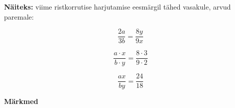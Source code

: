 \begin{center}
{{{\begin{flushleft}
\vspace{5mm}
\hspace{5mm} \textbf{Näiteks:} viime ristkorrutise harjutamise eesmärgil tähed vasakule, arvud paremale:

\begin{equation}
\label{eq13_17}
\dfrac{2a}{3b}=\dfrac{8y}{9x}
\end{equation}

\begin{equation}
\label{eq13_18}
\dfrac{a \cdot x}{b \cdot y}=\dfrac{8\cdot 3}{9\cdot 2}
\end{equation}

\begin{equation}
\label{eq13_19}
\dfrac{a x}{by}=\dfrac{24}{18}
\end{equation}



\end{flushleft}
}}}
\end{center}


\newpage
\vspace{1cm}

\textbf{Märkmed}\\
\vspace{2mm}
\begin{mdframed}[style=graphpaper]
\vspace{19cm}
\end{mdframed}